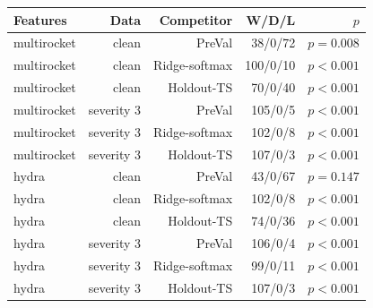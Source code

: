 \begin{tabular}{lrrrr}
\toprule
Features & Data & Competitor & W/D/L & $p$ \\
\midrule
multirocket & clean & PreVal & 38/0/72 & $p=0.008$ \\
multirocket & clean & Ridge-softmax & 100/0/10 & $p<0.001$ \\
multirocket & clean & Holdout-TS & 70/0/40 & $p<0.001$ \\
multirocket & severity 3 & PreVal & 105/0/5 & $p<0.001$ \\
multirocket & severity 3 & Ridge-softmax & 102/0/8 & $p<0.001$ \\
multirocket & severity 3 & Holdout-TS & 107/0/3 & $p<0.001$ \\
hydra & clean & PreVal & 43/0/67 & $p=0.147$ \\
hydra & clean & Ridge-softmax & 102/0/8 & $p<0.001$ \\
hydra & clean & Holdout-TS & 74/0/36 & $p<0.001$ \\
hydra & severity 3 & PreVal & 106/0/4 & $p<0.001$ \\
hydra & severity 3 & Ridge-softmax & 99/0/11 & $p<0.001$ \\
hydra & severity 3 & Holdout-TS & 107/0/3 & $p<0.001$ \\
\bottomrule
\end{tabular}
